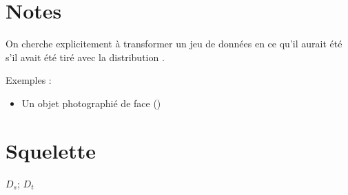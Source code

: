 

\chapter*{Notes}

On cherche explicitement à transformer un jeu de données en ce qu'il aurait 
été s'il avait été tiré avec la distribution \cible.

Exemples :
\begin{itemize}
	\item Un objet photographié de face (\source)
\end{itemize}











\chapter{Squelette}
$D_s$; $D_t$

